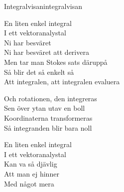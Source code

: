 \begin{song}{Integralvisan}{integralvisan}
\begin{vers}
En liten enkel integral\\
I ett vektoranalystal\\
Ni har besväret\\
Ni har besväret att derivera\\
Men tar man Stokes sats däruppå\\
Så blir det så enkelt så\\
Att integralen, att integralen evaluera\\
\end{vers}
\begin{vers}
Och rotationen, den integreras\\
Sen över ytan utav en boll\\
Koordinaterna transformeras\\
Så integranden blir bara noll\\
\end{vers}
\begin{vers}
En liten enkel integral\\
I ett vektoranalystal \\
Kan va så djävlig\\
Att man ej hinner\\
Med något mera\\
\end{vers}
\end{song}
